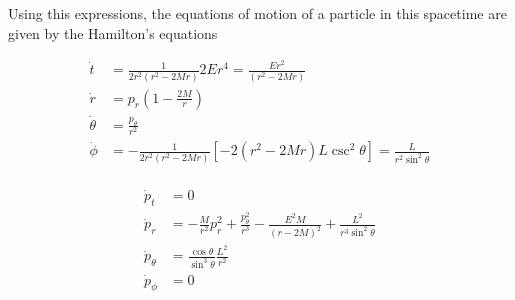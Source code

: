 Using this expressions, the equations of motion of a particle in this spacetime are given by the Hamilton's equations

\begin{align*}
	\dot{t} &= \frac{1}{2r^2(r^2 -2Mr)} 2E r^4 = \frac{E r^2}{(r^2 -2Mr)}  \\
	\dot{r} &= p_r \left(1 - \frac{2M}{r} \right)  \\
	\dot{\theta} &= \frac{p_\theta}{r^2}\\
	\dot{\phi} &= - \frac{1}{2r^2(r^2 -2Mr)} \left[ - 2(r^2 -2Mr)L \csc^2 \theta \right] = \frac{L}{r^2 \sin^2 \theta}\\	
\end{align*}

\begin{align*}
\dot{p}_t &= 0\\
\dot{p}_r &= - \frac{M}{r^2}p_r^2 +  \frac{p_\theta^2}{r^3} -\frac{E^2 M}{(r-2M)^2}  + \frac{L^2}{r^3 \sin^2 \theta} \\
\dot{p}_\theta &= \frac{\cos \theta}{\sin^3 \theta} \frac{L^2}{r^2}\\
\dot{p}_\phi &= 0\\	
\end{align*}

